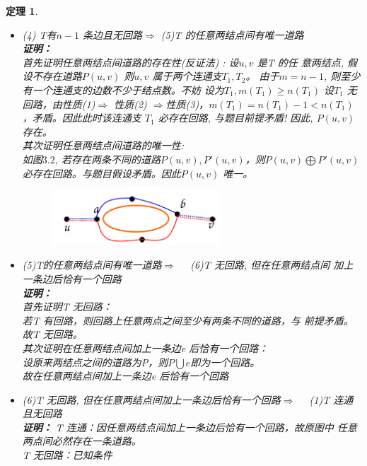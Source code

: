 \documentclass[11pt,a4paper,openany]{book}
\newtheorem{theorem}{\textbf{定理}}[section]
\begin{document}
\begin{theorem}
{\begin{itemize}
  \textbf{证明:}\\
  反证法: 假定T 有回路。\\
    设C 为其中一条含有k 个结点的初级回路，故回路内有k 条边。考察C 以外的$n-k $个结点, 为保持T 的连通性, 至少需要C 以外的n-k 条
    边。所以T 的边数至少为$k+(n-k)=n$ 条与T 有$n-1$ 条边矛盾，故假设不成立，即T 无回路。
  \item(4) T有$n-1$ 条边且无回路$\Rightarrow$ (5)T 的任意两结点间有唯一道路\\
  \textbf{证明：}\\
  首先证明任意两结点间道路的存在性(反证法) : 设$u,v$ 是T 的任
意两结点, 假设不存在道路$P(u,v)$ 则$u,v$ 属于两个连通支$T_1,T_2$。 由于$m=n-1$, 则至少有一个连通支的边数不少于结点数。不妨
设为$T_1,m(T_1)\geq n(T_1)$ 设$T_1$ 无回路，由性质(1)$\Rightarrow$ 性质(2)
$\Rightarrow$性质(3)，$m(T_1)=n(T_1)-1<n(T_1)$，矛盾。因此此时该连通支
$T_1$ 必存在回路, 与题目前提矛盾! 因此, $P(u,v)$ 存在。\\
其次证明任意两结点间道路的唯一性:\\
如图$3.2$, 若存在两条不同的道路$P(u,v), P'(u,v)$，则$P(u, v)\bigoplus P'(u, v)$
必存在回路。与题目假设矛盾。因此$P(u,v)$ 唯一。
\begin{figure}[H]
  \centering
  \includegraphics[width=0.6\textwidth]{3.2.png}\\
  \caption{}
\end{figure}
\item (5)T的任意两结点间有唯一道路$\Rightarrow \quad $ (6)T 无回路, 但在任意两结点间
加上一条边后恰有一个回路\\
\textbf{证明：}\\
 首先证明T 无回路：\\
若T 有回路，则回路上任意两点之间至少有两条不同的道路，与
前提矛盾。\\
故T 无回路。\\
 其次证明在任意两结点间加上一条边e 后恰有一个回路：\\
设原来两结点之间的道路为P，则$P\bigcup e $即为一个回路。\\
故在任意两结点间加上一条边e 后恰有一个回路\\

\item (6)T 无回路, 但在任意两结点间加上一条边后恰有一个回路$\Rightarrow \quad$ (1)T
连通且无回路\\
\textbf{证明：}
 T 连通：因任意两结点间加上一条边后恰有一个回路，故原图中
任意两点间必然存在一条道路。\\
T 无回路：已知条件
\end{itemize}
}
\end{theorem}
\end{document}

